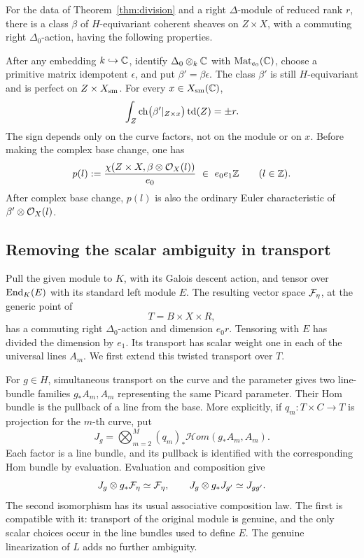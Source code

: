 \begin{proposition}\label{prop:rank-to-euler}
For the data of Theorem~\ref{thm:division} and a right
\(\Delta\)-module of reduced rank \(r\), there is a class \(\beta\)
of \(H\)-equivariant coherent sheaves on \(Z\times X\), with a
commuting right \(\Delta_0\)-action, having the following properties.

After any embedding \(k\hookrightarrow\mathbb C\), identify
\(\Delta_0\otimes_k\mathbb C\) with \(\operatorname{Mat}_{e_0}(\mathbb C)\), choose
a primitive matrix idempotent \(\epsilon\), and put
\(\beta'=\beta\epsilon\).
The class \(\beta'\) is still \(H\)-equivariant and is perfect on
\(Z\times X_{\mathrm{sm}}\).  For every \(x\in X_{\mathrm{sm}}(\mathbb C)\),
\begin{equation}\label{eq:descent-fiber-index}
\int_Z\operatorname{ch}\bigl(\beta'|_{Z\times x}\bigr)\operatorname{td}(Z)=\pm r.
\end{equation}
The sign depends only on the curve factors, not on the module or on
\(x\).  Before making the complex base change, one has
\begin{equation}\label{eq:descent-twist-divisibility}
p(l):=\frac{\chi(Z\times X,\beta\otimes\mathcal O_X(l))}{e_0}
       \ \in\ e_0e_1\mathbb Z\qquad(l\in\mathbb Z).
\end{equation}
After complex base change, \(p(l)\) is also the ordinary Euler
characteristic of \(\beta'\otimes\mathcal O_X(l)\).
\end{proposition}

\subsection{Removing the scalar ambiguity in transport}

Pull the given module to \(K\), with its Galois descent action, and
tensor over \(\operatorname{End}_K(E)\) with its standard left module \(E\).
The resulting vector space \(\mathcal F_\eta\), at the generic point of
\[
T=B\times X\times R,
\]
has a commuting right \(\Delta_0\)-action and dimension \(e_0r\).
Tensoring with \(E\) has divided the dimension by \(e_1\).
Its transport has scalar weight one in each of the universal lines
\(A_m\).  We first extend this twisted transport over \(T\).

For \(g\in H\), simultaneous transport on the curve and the parameter
gives two line-bundle families \(g_*A_m,A_m\) representing the same
Picard parameter.  Their Hom bundle is the pullback of a line from
the base. More explicitly, if \(q_m:T\times C\to T\) is projection for
the \(m\)-th curve, put
\[
 J_g=\bigotimes_{m=2}^M(q_m)_*\mathcal{H}om(g_*A_m,A_m).
\]
Each factor is a line bundle, and its pullback is identified with the
corresponding Hom bundle by evaluation. Evaluation and composition give
\begin{equation}\label{eq:hom-line-transport}
J_g\otimes g_*\mathcal F_\eta\simeq\mathcal F_\eta,\qquad
J_g\otimes g_*J_{g'}\simeq J_{gg'}.
\end{equation}
The second isomorphism has its usual associative composition law.
The first is compatible with it: transport of the original module
is genuine, and the only scalar choices occur in the line bundles
used to define \(E\).  The genuine linearization of \(L\) adds no
further ambiguity.

